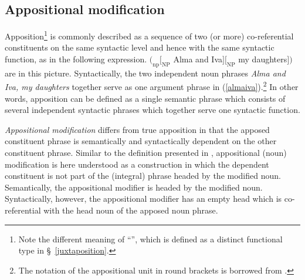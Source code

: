 \subsection{Appositional modification} \label{apposition}
Apposition\footnote{Note the different meaning of “”, which is defined as a distinct functional type in \S~\ref{juxtaposition}.} is commonly described as a sequence of two (or more) co-referential constituents on the same syntactic level and hence with the same syntactic function, as in the following expression.
\ea
$(_\textrm{np} [_\textrm{NP}$ Alma and Iva$] [_\textrm{NP}$ my daughters$] )$ are in this picture. \label{almaiva}
\z{}
Syntactically, the two independent noun phrases \textit{Alma and Iva, my daughters} together serve as one argument phrase in (\ref{almaiva}).\footnote{The notation of the appositional unit in round brackets is borrowed from \citet[21]{rijkhoff2002}.} In other words, apposition can be defined as a single semantic phrase which consists of several independent syntactic phrases which together serve one syntactic function.

\emph{Appositional modification} differs from true apposition in that the apposed constituent phrase is semantically and syntactically dependent on the other constituent phrase. Similar to the definition presented in \citet[22]{rijkhoff2002}, appositional (noun) modification is here understood as a construction in which the dependent constituent is not part of the (integral) phrase headed by the modified noun. Semantically, the appositional modifier is headed by the modified noun. Syntactically, however, the appositional modifier has an empty head which is co-referential with the head noun of the apposed noun phrase.

